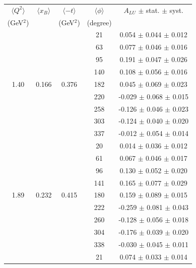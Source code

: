 \documentclass[aps,prc,preprint,superscriptaddress]{revtex4}
\begin{document}
\begin{table}[!h]
   \begin{center}
      \begin{tabular}{|c|c|c|c|c|}
         \hline
 $\langle Q^{2} \rangle$ & $\langle x_{B} \rangle$ & $\langle -t \rangle$ & $\langle \phi \rangle$ & $A_{LU}$ $\pm$ stat. $\pm$ syst.\\
 (GeV$^{2}$) &           & (GeV$^{2}$) & (degree) &  \\
 \hline 
        &       &        &   21   &   0.054  $\pm$  0.044   $\pm$ 0.012  \\
        &       &        &   63   &   0.077  $\pm$  0.046   $\pm$ 0.016  \\
        &       &        &   95   &   0.191  $\pm$  0.047   $\pm$ 0.026  \\
        &       &        &  140   &   0.108  $\pm$  0.056   $\pm$ 0.016  \\
  1.40  & 0.166 & 0.376  &  182   &   0.045  $\pm$  0.069   $\pm$ 0.023  \\
        &       &        &  220   &  -0.029  $\pm$  0.068   $\pm$ 0.015  \\
        &       &        &  258   &  -0.126  $\pm$  0.046   $\pm$ 0.023  \\
        &       &        &  303   &  -0.124  $\pm$  0.040   $\pm$ 0.020  \\
        &       &        &  337   &  -0.012  $\pm$  0.054   $\pm$ 0.014  \\
  \hline 
        &       &        &   20   &   0.014  $\pm$  0.036   $\pm$ 0.012  \\
        &       &        &   61   &   0.067  $\pm$  0.046   $\pm$ 0.017  \\
        &       &        &   96   &   0.130  $\pm$  0.052   $\pm$ 0.020  \\
        &       &        &  141   &   0.165  $\pm$  0.077   $\pm$ 0.029  \\
  1.89  & 0.232 & 0.415  &  180   &   0.159  $\pm$  0.089   $\pm$ 0.015  \\
        &       &        &  222   &  -0.259  $\pm$  0.081   $\pm$ 0.043  \\
        &       &        &  260   &  -0.128  $\pm$  0.056   $\pm$ 0.018  \\
        &       &        &  304   &  -0.176  $\pm$  0.039   $\pm$ 0.020  \\
        &       &        &  338   &  -0.030  $\pm$  0.045   $\pm$ 0.011  \\
  \hline 
        &       &        &   21   &   0.074  $\pm$  0.033   $\pm$ 0.014  \\

\end{tabular}
\end{center}
\end{table}
\end{document}
